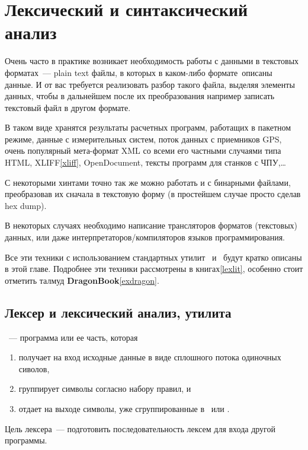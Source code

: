 \chapter{Лексический и синтаксический анализ}

Очень часто в практике возникает необходимость работы с данными в текстовых
форматах\ --- plain text файлы, в которых в каком-либо формате\ описаны данные. И от вас
требуется реализовать разбор такого файла, выделяя элементы данных, чтобы в
дальнейшем после их преобразования например записать текстовый файл в другом
формате.

В таком виде хранятся результаты расчетных программ, работащих в пакетном
режиме, данные с измерительных систем, поток данных с приемников
GPS, очень популярный мета-формат XML со всеми его
частными случаями типа HTML, XLIFF\ref{xliff}, OpenDocument, тексты программ для
станков с ЧПУ,\ldots

С некоторыми хинтами точно так же можно работать и с бинарными файлами,
преобразовав их сначала в текстовую форму (в простейшем случае просто сделав hex
dump).

В некоторых случаях необходимо написание трансляторов форматов (текстовых)
данных, или даже интерпретаторов/компиляторов языков программирования.

\bigskip
Все эти техники с использованием стандартных утилит \ и
\ будут кратко описаны в этой главе.
Подробнее эти техники рассмотрены в книгах\ref{lexlit}, особенно стоит отметить
талмуд \textbf{DragonBook}\ref{exdragon}.

\section{Лексер и лексический анализ, утилита }

\begin{framed}
\ --- программа или ее часть, которая 
\begin{enumerate}
  \item 
получает на вход исходные
данные в виде сплошного потока одиночных сиволов, 
  \item 
группирует символы согласно
набору правил, и 
  \item 
отдает на выходе символы, уже сгруппированные в \ или
.
\end{enumerate}
Цель лексера\ --- подготовить последовательность лексем для входа другой
программы.
\end{framed}

